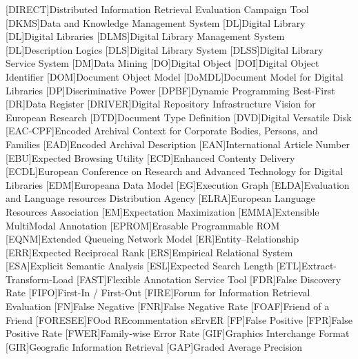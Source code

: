 [DIRECT]{Distributed Information Retrieval Evaluation Campaign Tool}
[DKMS]{Data and Knowledge Management System}
[DL]{Digital Library}
[DL]{Digital Libraries}
[DLMS]{Digital Library Management System}
[DL]{Description Logics}
[DLS]{Digital Library System}
[DLSS]{Digital Library Service System}
[DM]{Data Mining}
[DO]{Digital Object}
[DOI]{Digital Object Identifier}
[DOM]{Document Object Model}
[DoMDL]{Document Model for Digital Libraries}
[DP]{Discriminative Power}
[DPBF]{Dynamic Programming Best-First}
[DR]{Data Register}
[DRIVER]{Digital Repository Infrastructure Vision for European Research}
[DTD]{Document Type Definition}
[DVD]{Digital Versatile Disk}
[EAC-CPF]{Encoded Archival Context for Corporate Bodies, Persons, and Families}
[EAD]{Encoded Archival Description}
[EAN]{International Article Number}
[EBU]{Expected Browsing Utility}
[ECD]{Enhanced Contenty Delivery}
[ECDL]{European Conference on Research and Advanced Technology for Digital Libraries}
[EDM]{Europeana Data Model}
[EG]{Execution Graph}
[ELDA]{Evaluation and Language resources Distribution Agency}
[ELRA]{European Language Resources Association}
[EM]{Expectation Maximization}
[EMMA]{Extensible MultiModal Annotation}
[EPROM]{Erasable Programmable \acs{ROM}}
[EQNM]{Extended Queueing Network Model}
[ER]{Entity--Relationship}
[ERR]{Expected Reciprocal Rank}
[ERS]{Empirical Relational System}
[ESA]{Explicit Semantic Analysis}
[ESL]{Expected Search Length}
[ETL]{Extract-Transform-Load}
[FAST]{Flexible Annotation Service Tool}
[FDR]{False Discovery Rate}
[FIFO]{First-In / First-Out}
[FIRE]{Forum for Information Retrieval Evaluation}
[FN]{False Negative}
[FNR]{False Negative Rate}
[FOAF]{Friend of a Friend}
[FORESEE]{FOod REcommentation sErvER}
[FP]{False Positive}
[FPR]{False Positive Rate}
[FWER]{Family-wise Error Rate}
[GIF]{Graphics Interchange Format}
[GIR]{Geografic Information Retrieval}
[GAP]{Graded Average Precision}

